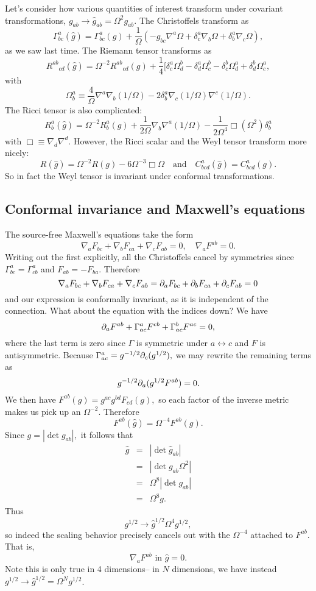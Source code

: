Let's consider how various quantities of interest transform under covariant transformations,
$g_{ab}\to \hat g_{ab}=\Omega^2 g_{ab}.$
The Christoffels transform as
$$\Gamma^a_{bc}(\hat g)=\Gamma^a_{bc}(g)+\frac{1}{\Omega}(-g_{bc}\nabla^a \Omega +\delta^a_c \nabla_b \Omega +\delta^a_b \nabla_c \Omega),$$
as we saw last time. The Riemann tensor transforms as
$${R^{ab}}_{cd}(\hat g)=\Omega^{-2}{R^{ab}}_{cd}(g)+\frac{1}{4}[\delta^a_c \Omega^b_d - \delta^a_d \Omega^b_c -\delta^b_c \Omega^a_d +\delta^b_d \Omega^a_c,$$
with $$\Omega^a_b\equiv \frac{4}{\Omega}\nabla^a \nabla_b (1/\Omega)-2\delta^a_b \nabla_c(1/\Omega) \nabla^c(1/\Omega).$$
The Ricci tensor is also complicated:
$$R^a_b(\hat g)=\Omega^{-2}R^a_b(g) +\frac{1}{2\Omega}\nabla_b \nabla^a (1/\Omega)-\frac{1}{2\Omega^4}\Box (\Omega^2)\delta^a_b$$
with $\Box\equiv \nabla_d \nabla^d.$ However, the Ricci scalar and the Weyl tensor transform more nicely:
$$R(\hat g)=\Omega^{-2}R(g)-6\Omega^{-3}\Box \Omega \quad\text{and}\quad C^a_{bcd}(\hat g)=C^a_{bcd}(g).$$
So in fact the Weyl tensor is invariant under conformal transformations.

\subsection*{Conformal invariance and Maxwell's equations} The source-free Maxwell's equations take the form
$$\nabla_a F_{bc}+\nabla_b F_{ca}+\nabla_c F_{ab}=0, \quad \nabla_a F^{ab}=0.$$
Writing out the first explicitly, all the Christoffels cancel by symmetries since $\Gamma^a_{bc}=\Gamma^a_{cb}$ and $F_{ab}=-F_{ba}.$ Therefore 
$$\nabla_a F_{bc}+\nabla_b F_{ca}+\nabla_c F_{ab}= \partial_a F_{bc} + \partial_b F_{ca}+\partial_c F_{ab}=0$$ and our expression is conformally invariant, as it is independent of the connection. What about the equation with the indices down? We have
$$\partial_a F^{ab}+\Gamma^a_{ac} F^{cb}+\Gamma^b_{ac} F^{ac}=0,$$
where the last term is zero since $\Gamma$ is symmetric under $a\leftrightarrow c$ and $F$ is antisymmetric. Because $\Gamma^a_{ac}=g^{-1/2}\partial_c (g^{1/2}),$ we may rewrite the remaining terms as
$$g^{-1/2}\partial_a (g^{1/2}F^{ab})=0.$$
We then have $F^{ab}(g)=g^{ac} g^{bd}F_{cd}(g),$ so each factor of the inverse metric makes us pick up an $\Omega^{-2}$. Therefore
$$F^{ab}(\hat g)=\Omega^{-4}F^{ab}(g).$$
Since $g=|\det g_{ab}|,$ it follows that
\begin{eqnarray*}
\hat g&=&|\det \hat g_{ab}|\\
&=&|\det g_{ab} \Omega^2|\\
&=&\Omega^8 |\det g_{ab}|\\
&=&\Omega^8 g.
\end{eqnarray*}
Thus $$g^{1/2}\to \hat g^{1/2}\Omega^4 g^{1/2},$$ so indeed the scaling behavior precisely cancels out with the $\Omega^{-4}$ attached to $F^{ab}$. That is,
$$\nabla_a F^{ab}\text{ in }\hat g=0.$$
Note this is only true in 4 dimensions-- in $N$ dimensions, we have instead $g^{1/2}\to \hat g^{1/2}=\Omega^N g^{1/2}$.

